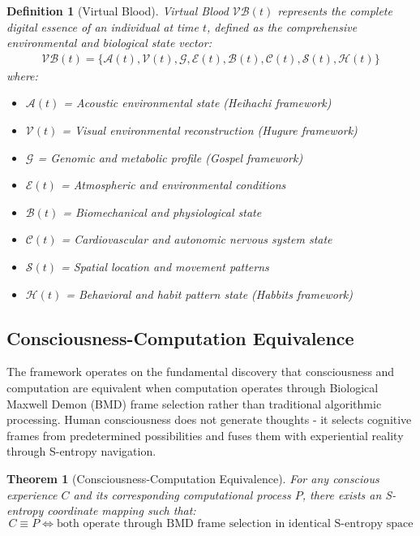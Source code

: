 \documentclass[12pt,a4paper]{article}
\newtheorem{theorem}{Theorem}
\newtheorem{definition}{Definition}
\begin{document}
\begin{definition}[Virtual Blood]
Virtual Blood $\mathcal{VB}(t)$ represents the complete digital essence of an individual at time $t$, defined as the comprehensive environmental and biological state vector:
\begin{align}
\mathcal{VB}(t) = \{\mathcal{A}(t), \mathcal{V}(t), \mathcal{G}, \mathcal{E}(t), \mathcal{B}(t), \mathcal{C}(t), \mathcal{S}(t), \mathcal{H}(t)\}
\end{align}
where:
\begin{itemize}
\item $\mathcal{A}(t)$ = Acoustic environmental state (Heihachi framework)
\item $\mathcal{V}(t)$ = Visual environmental reconstruction (Hugure framework)  
\item $\mathcal{G}$ = Genomic and metabolic profile (Gospel framework)
\item $\mathcal{E}(t)$ = Atmospheric and environmental conditions
\item $\mathcal{B}(t)$ = Biomechanical and physiological state
\item $\mathcal{C}(t)$ = Cardiovascular and autonomic nervous system state
\item $\mathcal{S}(t)$ = Spatial location and movement patterns
\item $\mathcal{H}(t)$ = Behavioral and habit pattern state (Habbits framework)
\end{itemize}
\end{definition}

\subsection{Consciousness-Computation Equivalence}

The framework operates on the fundamental discovery that consciousness and computation are equivalent when computation operates through Biological Maxwell Demon (BMD) frame selection rather than traditional algorithmic processing. Human consciousness does not generate thoughts - it selects cognitive frames from predetermined possibilities and fuses them with experiential reality through S-entropy navigation.

\begin{theorem}[Consciousness-Computation Equivalence]
For any conscious experience $C$ and its corresponding computational process $P$, there exists an S-entropy coordinate mapping such that:
\begin{equation}
C \equiv P \iff \text{both operate through BMD frame selection in identical S-entropy space}
\end{equation}
\end{theorem}
\end{document}
